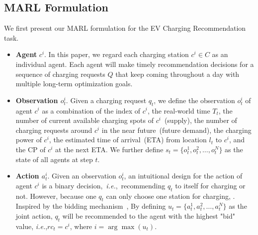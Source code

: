 \documentclass[sigconf]{acmart}
\newcommand{\hao}[1]{{\color{black}{#1}}}
\newcommand{\ie}{\emph{i.e.},\xspace}
\begin{document}

\subsection{MARL Formulation}\label{sec:formulation}
We first present our MARL formulation for the EV Charging Recommendation task. 
\begin{itemize}
	\item \textbf{Agent} $c^i$. In this paper, we regard each charging station $c^i \in C$ as an individual agent.
	Each agent will make timely recommendation decisions for a sequence of charging requests $Q$ that keep coming throughout a day with multiple long-term optimization goals.
	
	\item \textbf{Observation $o_t^i$}. 
	Given a charging request $q_t$, we define the observation $o_t^i$ of agent $c^i$ as a combination of the index of $c^i$, the real-world time $T_t$, the number of current available charging spots of $c^i$~(supply), the number of charging requests around $c^i$ in the near future~(future demand), the charging power of $c^i$, the estimated time of arrival~(ETA) from location $l_t$ to $c^i$, and the CP of $c^i$ at the next ETA. We further define $s_t=\{o_t^1,o_t^2,\dots,o_t^N\}$ as the state of all agents at step $t$.
	
	\item \textbf{Action $a_t^i$}. 
	Given an observation $o_t^i$, an intuitional design for the action of agent $c^i$ is a binary decision,~\ie~recommending $q_t$ to itself for charging or not. However, because one $q_t$ can only choose one station for charging, \hao{multiple agents' actions may be tied together and are difficult to coordinate}.
	Inspired by the bidding mechanism~\cite{zhao2018deep}, \hao{we design each agent $c^i$ offers a scalar value to "bid" for $q_t$ as its action $a_t^i$.} 
	By defining $u_t=\{a_t^1,a_t^2,\dots,a_t^N\}$ as the joint action, $q_t$ will be recommended to the agent with the highest "bid" value, \ie $rc_t=c^i$, where $i=\arg\max(u_t)$.
	

\end{itemize}
\end{document}
